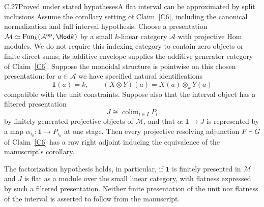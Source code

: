 \begin{claim}{C.27}{Proved under stated hypotheses}{A flat interval can be approximated by split inclusions}\label{C27}
Assume the corollary setting of Claim~\ref{C6}, including the canonical normalization and full interval hypothesis. Choose a presentation $\mathcal M\simeq\operatorname{Fun}_k(\mathcal A^{\mathrm{op}},\Mod k)$ by a small $k$-linear category $\mathcal A$ with projective Hom modules. We do not require this indexing category to contain zero objects or finite direct sums; its additive envelope supplies the additive generator category of Claim~\ref{C6}. Suppose the monoidal structure is pointwise on this chosen presentation: for $a\in\mathcal A$ we have specified natural identifications
\[
 \mathbf1(a)=k,\qquad (X\otimes Y)(a)=X(a)\otimes_kY(a)
\]
compatible with the unit constraints. Suppose also that the interval object has a filtered presentation
\[
 J\cong\mathop{\mathrm{colim}}_{i\in I}P_i
\]
by finitely generated projective objects of $\mathcal M$, and that $\alpha:\mathbf1\to J$ is represented by a map $\alpha_{i_0}:\mathbf1\to P_{i_0}$ at one stage. Then every projective resolving adjunction $F\dashv G$ of Claim~\ref{C6} has a raw right adjoint inducing the equivalence of the manuscript's corollary.

The factorization hypothesis holds, in particular, if $\mathbf1$ is finitely presented in $\mathcal M$ and $J$ is flat as a module over the small linear category, with flatness expressed by such a filtered presentation. Neither finite presentation of the unit nor flatness of the interval is asserted to follow from the manuscript.
\end{claim}
